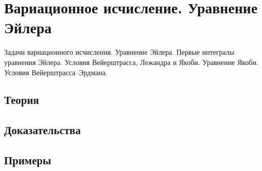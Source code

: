 
\section{Вариационное исчисление. Уравнение Эйлера}
\label{sec:2.4.09-variational-calculus}

\begin{ticket}
Задачи вариационного исчисления. Уравнение Эйлера. Первые интегралы уравнения Эйлера. Условия Вейерштрасса, Лежандра и Якоби. Уравнение Якоби. Условия Вейерштрасса–Эрдмана.
\end{ticket}

\subsection*{Теория}

\subsection*{Доказательства}

\subsection*{Примеры}
